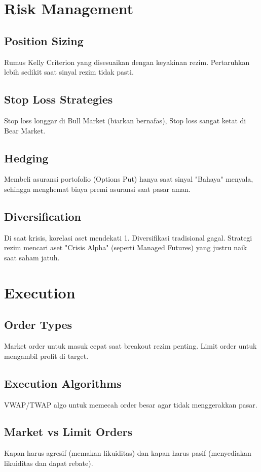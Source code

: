 \documentclass[12pt,a4paper]{book}
\begin{document}
\section{Risk Management}
\subsection{Position Sizing}
Rumus Kelly Criterion yang disesuaikan dengan keyakinan rezim. Pertaruhkan lebih sedikit saat sinyal rezim tidak pasti.

\subsection{Stop Loss Strategies}
Stop loss longgar di Bull Market (biarkan bernafas), Stop loss sangat ketat di Bear Market.

\subsection{Hedging}
Membeli asuransi portofolio (Options Put) hanya saat sinyal "Bahaya" menyala, sehingga menghemat biaya premi asuransi saat pasar aman.

\subsection{Diversification}
Di saat krisis, korelasi aset mendekati 1. Diversifikasi tradisional gagal. Strategi rezim mencari aset "Crisis Alpha" (seperti Managed Futures) yang justru naik saat saham jatuh.

\section{Execution}
\subsection{Order Types}
Market order untuk masuk cepat saat breakout rezim penting. Limit order untuk mengambil profit di target.

\subsection{Execution Algorithms}
VWAP/TWAP algo untuk memecah order besar agar tidak menggerakkan pasar.

\subsection{Market vs Limit Orders}
Kapan harus agresif (memakan likuiditas) dan kapan harus pasif (menyediakan likuiditas dan dapat rebate).
\end{document}
